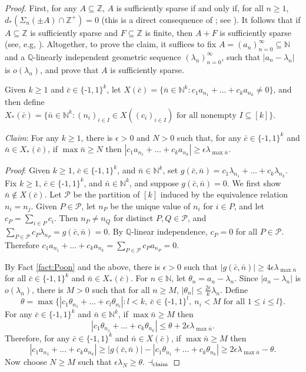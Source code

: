 \documentclass{amsart}
\def\seq{\subseteq}
\newcommand{\nv}{\text{-}}
\newcommand{\cbar}{\bar{c}}
\newcommand{\nbar}{\bar{n}}
\newcommand{\noit}[1]{\noindent\textit{#1}}
\newcommand{\claim}{\hfill$\dashv_{\text{\scriptsize{claim}}}$}
\newcommand{\cP}{\mathcal{P}}
\def\N{\mathbb N}
\def\Q{\mathbb Q}
\def\Z{\mathbb Z}
\theoremstyle{definition}
\begin{document}
\begin{proof}
First, for any $A\seq\Z$, $A$ is sufficiently sparse if and only if, for all $n\geq 1$, $d_*(\Sigma_n(\pm A)\cap \Z^+)=0$ (this is a direct consequence of \cite{NaNa}; see \cite[Proposition 4.2]{CoSS}). It follows that if $A\seq\Z$ is sufficiently sparse and $F\seq\Z$ is finite, then $A+F$ is sufficiently sparse (see, e.g, \cite[Lemma 4.3]{CoSS}). Altogether, to prove the claim, it suffices to fix $A=(a_n)_{n=0}^\infty\seq\N$ and a $\Q$-linearly independent geometric sequence $(\lambda_n)_{n=0}^\infty$, such that $|a_n-\lambda_n|$ is $o(\lambda_n)$, and prove that $A$ is sufficiently sparse.


Given $k\geq 1$ and $\cbar\in\{\nv 1,1\}^k$, let $X(\cbar)=\{\nbar\in\N^k:c_1a_{n_1}+\ldots+c_ka_{n_k}\neq 0\}$, and then define $X_*(\cbar)=\{\nbar\in\N^k:(n_i)_{i\in I}\in X((c_i)_{i\in I})\text{ for all nonempty $I\seq[k]$}\}$.


\noit{Claim}: For any $k\geq 1$, there is $\epsilon>0$ and $N>0$ such that, for any $\cbar\in\{\nv 1,1\}^k$ and $\nbar\in X_*(\cbar)$, if $\max\nbar\geq N$ then $|c_1a_{n_1}+\ldots+c_ka_{n_k}|\geq\epsilon\lambda_{\max\nbar}$. 

\noit{Proof}: Given $k\geq 1$, $\cbar\in\{\nv 1,1\}^k$, and $\nbar\in\N^k$, set $g(\cbar,\nbar)=c_1\lambda_{n_1}+\ldots+c_k\lambda_{n_k}$. Fix $k\geq 1$, $\cbar\in\{\nv 1,1\}^k$, and $\nbar\in\N^k$, and suppose $g(\cbar,\nbar)=0$. We first show $\nbar\not\in X(\cbar)$. Let $\cP$ be the partition of $[k]$ induced by the equivalence relation $n_i=n_j$. Given $P\in \cP$, let $n_P$ be the unique value of $n_i$ for $i\in P$, and let $c_P=\sum_{i\in P}c_i$. Then $n_P\neq n_Q$ for distinct $P,Q\in\cP$, and  $\sum_{P\in \cP}c_P\lambda_{n_P}=g(\cbar,\nbar)=0$. By $\Q$-linear independence, $c_P=0$ for all $P\in\cP$. Therefore $c_1a_{n_1}+\ldots+c_ka_{n_k}=\sum_{P\in\cP}c_Pa_{n_P}=0$. 

By Fact \ref{fact:Poon} and the above, there is $\epsilon>0$ such that $|g(\cbar,\nbar)|\geq 4\epsilon\lambda_{\max\nbar}$ for all $\cbar\in\{\nv 1,1\}^k$ and $\nbar\in X_*(\cbar)$. For $n\in\N$, let $\theta_n=a_n-\lambda_n$.  Since $|a_n-\lambda_n|$ is $o(\lambda_n)$, there is $M>0$ such that for all $n\geq M$, $|\theta_n|\leq \frac{2\epsilon}{k}\lambda_n$. Define
\[
\theta=\max\{|c_1\theta_{n_1}+\ldots+c_l\theta_{n_l}|:l< k,~\cbar\in\{\nv 1,1\}^l,~n_i<M\text{ for all $1\leq i\leq l$}\}.
\]
For any $\cbar\in\{\nv 1,1\}^k$ and $\nbar\in\N^k$, if $\max\nbar\geq M$ then
\[
|c_1\theta_{n_1}+\ldots+c_k\theta_{n_k}|\leq \theta+2\epsilon\lambda_{\max\nbar}.
\]
Therefore, for any $\cbar\in\{\nv 1,1\}^k$ and $\nbar\in X(\cbar)$, if $\max\nbar\geq M$ then
\[
|c_1a_{n_1}+\ldots+c_ka_{n_k}|\geq |g(\cbar,\nbar)|-|c_1\theta_{n_1}+\ldots+c_k\theta_{n_k}|\geq 2\epsilon\lambda_{\max \nbar}-\theta.
\]
Now choose $N\geq M$ such that $\epsilon\lambda_N\geq \theta$. \claim


\end{proof}
\end{document}
